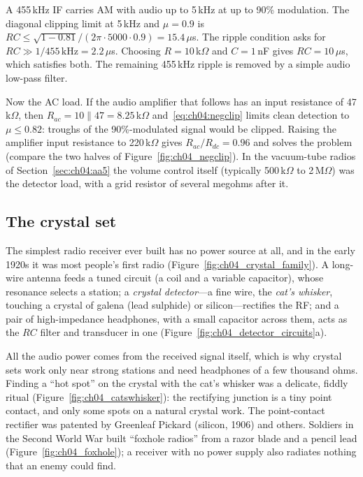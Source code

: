 \begin{worked}
A 455\,kHz IF carries AM with audio up to 5\,kHz at up to 90\% modulation. The diagonal clipping limit at
5\,kHz and $\mu=0.9$ is $RC\le\sqrt{1-0.81}/(2\pi\cdot 5000\cdot 0.9)=15.4\,\mu$s. The ripple condition
asks for $RC\gg 1/455\,\text{kHz}=2.2\,\mu$s. Choosing $R=10$\,k$\Omega$ and $C=1$\,nF gives
$RC=10\,\mu$s, which satisfies both. The remaining 455\,kHz ripple is removed by a simple audio low-pass
filter.

Now the AC load. If the audio amplifier that follows has an input resistance of 47\,k$\Omega$, then
$R_{ac}=10\parallel47=8.25$\,k$\Omega$ and~\eqref{eq:ch04:negclip} limits clean detection to
$\mu\le0.82$: troughs of the 90\%-modulated signal would be clipped. Raising the amplifier input
resistance to 220\,k$\Omega$ gives $R_{ac}/R_{dc}=0.96$ and solves the problem
(compare the two halves of Figure~\ref{fig:ch04_negclip}). In the vacuum-tube radios
of Section~\ref{sec:ch04:aa5} the volume control itself (typically 500\,k$\Omega$ to 2\,M$\Omega$) was the
detector load, with a grid resistor of several megohms after it.
\end{worked}

\subsection{The crystal set}

The simplest radio receiver ever built has no power source at all, and in the early 1920s it was most
people's first radio (Figure~\ref{fig:ch04_crystal_family}). A long-wire antenna feeds a tuned circuit (a
coil and a variable capacitor), whose resonance selects a station; a \emph{crystal detector}---a fine
wire, the \emph{cat's whisker}, touching a crystal of galena (lead sulphide) or silicon---rectifies the
RF; and a pair of high-impedance headphones, with a small capacitor across them, acts as the $RC$ filter
and transducer in one (Figure~\ref{fig:ch04_detector_circuits}a).


All the audio power comes from the received signal itself, which is why crystal sets work only near
strong stations and need headphones of a few thousand ohms. Finding a ``hot spot'' on the crystal with
the cat's whisker was a delicate, fiddly ritual (Figure~\ref{fig:ch04_catswhisker}): the rectifying
junction is a tiny point contact, and only some spots on a natural crystal work. The point-contact
rectifier was patented by Greenleaf Pickard (silicon, 1906) and others. Soldiers in the Second World
War built ``foxhole radios'' from a razor blade and a pencil lead (Figure~\ref{fig:ch04_foxhole}); a
receiver with no power supply also radiates nothing that an enemy could find.

